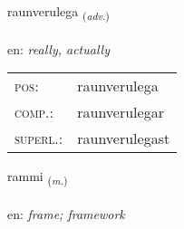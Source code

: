 \documentclass[frontgrid, backgrid]{flacards}\usepackage[]{graphicx}\usepackage[]{xcolor}
\begin{document}
\renewcommand{\blhead}{\vskip5pt {\small\bfseries\footnotesize Atviksorð | Adverb }}
\renewcommand{\bcfoot}{\vskip5pt \hspace{2pt}{\small\bfseries\footnotesize 3K}}


{raunverulega \small{\textsubscript{(\textit{adv.})}} \\[1ex] %
\textphonetic{[rœinvɛrʏlɛɣa]} \\
en: \emph{really, actually} \\  [2ex]
\renewcommand*{\arraystretch}{0.8}
\begin{tabular}{ll}
\textsc{pos}: & raunverulega \\ 
\textsc{comp.}: & raunverulegar \\ 
\textsc{superl.}: & raunverulegast \\
\end{tabular}
}

\renewcommand{\flhead}{\vskip5pt \fboxsep=0pt {\small\bfseries\footnotesize Nafnorð | Noun}}
\renewcommand{\fcfoot}{\vskip5pt \fboxsep=0pt \hspace{2pt}{\small\bfseries\footnotesize 3K}}

\renewcommand{\blhead}{\vskip5pt {\small\bfseries\footnotesize Nafnorð | Noun }}
\renewcommand{\bcfoot}{\vskip5pt \hspace{2pt}{\small\bfseries\footnotesize 3K}}


{rammi \small{\textsubscript{(\textit{m.})}} \\[1ex] %
\textphonetic{[ramɪ]} \\
en: \emph{frame; framework} \\  [2ex]
\renewcommand*{\arraystretch}{0.8}
}

\renewcommand{\flhead}{\vskip5pt \fboxsep=0pt {\small\bfseries\footnotesize Nafnorð | Noun}}
\renewcommand{\fcfoot}{\vskip5pt \fboxsep=0pt \hspace{2pt}{\small\bfseries\footnotesize 3K}}
\end{document}
